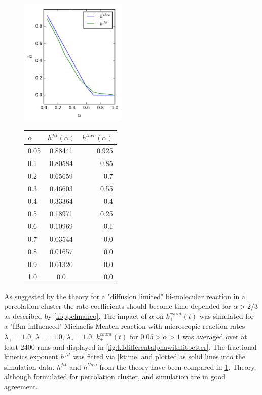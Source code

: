 \documentclass[
  a4paper,BCOR10mm,twoside,
  headsepline,footsepline,%
  fleqn,openbib
]{scrbook}
\begin{document}
\begin{figure}[h]
  \centering
  \includegraphics[width=0.45\textwidth]{./data/hvsalpha.png}
  \qquad
  \begin{tabular}[b]{ l | c | r }
  $\alpha$ & $h^{fit}(\alpha)$ & $h^{theo}(\alpha)$ \\
  \hline
  0.05 & 0.88441 & 0.925 \\
  0.1 & 0.80584 & 0.85 \\
  0.2 & 0.65659 & 0.7 \\
  0.3 & 0.46603 &  0.55  \\
  0.4 & 0.33364 & 0.4 \\
  0.5 & 0.18971 & 0.25 \\
  0.6 & 0.10969 & 0.1 \\
  0.7 & 0.03544 & 0.0 \\
  0.8 & 0.01657 & 0.0 \\
  0.9 & 0.01320 & 0.0 \\
  1.0 & 0.0 & 0.0\vspace{1.0cm}
  \end{tabular}
  \captionsetup{labelformat=andtable}
  \label{fig:k1differentalphawithfitbetter1}
\end{figure}
As suggested by the theory for a "diffusion limited" bi-molecular reaction in a percolation cluster the rate coefficients should become time depended for $\alpha>2/3$ as described by \cref{koppelmaneq}. The impact of $\alpha$ on $k^{count}_+(t)$ was simulated for a "fBm-influenced" Michaelis-Menten reaction with microscopic reaction rates  $\lambda_+=1.0$, $\lambda_-=1.0$,  $\lambda_c=1.0$.  $k^{count}_+(t)$ for $0.05>\alpha>1$ was averaged over at least $2400$ runs and displayed in \cref{fig:k1differentalphawithfitbetter}. The fractional kinetics exponent $h^{fit}$ was fitted via \cref{ktime} and plotted as solid lines into the simulation data. $h^{fit}$ and  $h^{theo}$ from the theory have been compared in \cref{fig:k1differentalphawithfitbetter1}. Theory, although formulated for percolation cluster, and simulation are in good agreement.
\end{document}
